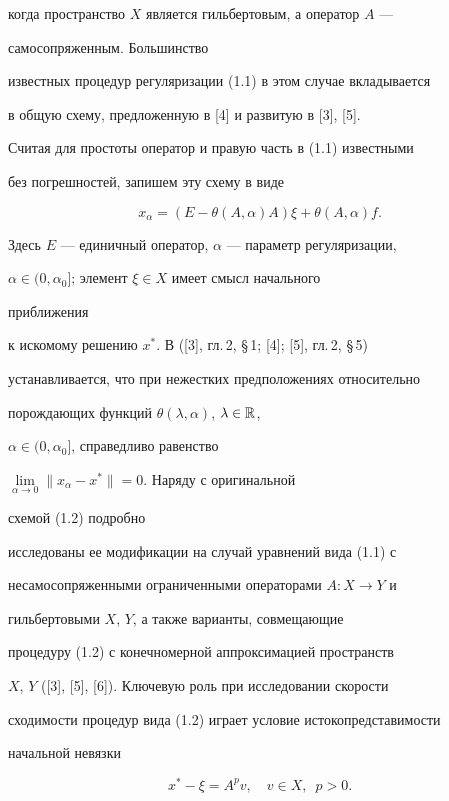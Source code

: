 когда пространство $X$ является гильбертовым, а оператор $A$ --- 


самосопряженным. Большинство 


известных процедур регуляризации (1.1) в этом случае вкладывается 


в общую схему, предложенную в [4] и развитую в [3], [5]. 


Считая для простоты оператор и правую часть в (1.1) известными 


без погрешностей, запишем эту схему в виде 


\begin{equation} 


x_\alpha=(E-\theta(A,\alpha)A)\xi+\theta(A,\alpha)f. 


\end{equation} 


Здесь $E$ --- единичный оператор, $\alpha$ --- параметр регуляризации, 


$\alpha\in(0,\alpha_0]$; элемент $\xi\in X$ имеет смысл начального 


приближения 


к искомому решению $x^*$. В ([3], гл.\,2, \S\,1; [4]; [5], гл.\,2, \S\,5) 


устанавливается, что при нежестких предположениях относительно 


порождающих функций $\theta(\lambda,\alpha)$, $\lambda\in\Bbb R$, 


$\alpha\in(0,\alpha_0]$, справедливо равенство 


$\lim\limits_{\alpha\to0}\|x_\alpha-x^*\|=0$. Наряду с оригинальной 


схемой (1.2) подробно 


исследованы ее модификации на случай уравнений вида (1.1) с 


несамосопряженными ограниченными операторами $A:X\to Y$ и 


гильбертовыми $X$, $Y$, а также варианты, совмещающие 


процедуру (1.2) с конечномерной аппроксимацией пространств 


$X$, $Y$ ([3], [5], [6]). Ключевую роль при исследовании скорости 


сходимости процедур вида (1.2) играет условие истокопредставимости 


начальной невязки 


\begin{equation} 


x^*-\xi=A^p v,\quad v\in X,\ \; p>0. 


\end{equation} 



